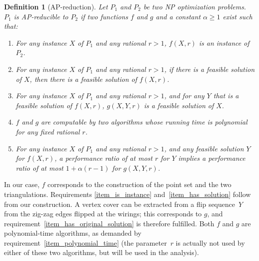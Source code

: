 \documentclass[11pt,a4paper]{article}
\newtheorem{definition}{Definition}
\begin{document}
\begin{definition}[AP-reduction]\label{def_ap_reduction}
Let $P_1$ and $P_2$ be two NP optimization problems.
$P_1$ is \emph{AP-reducible} to $P_2$ if two functions $f$ and $g$ and a constant $\alpha \geq 1$ exist such that:
\begin{enumerate}
 \item\label{item_is_instance} For any instance $X$ of $P_1$ and any rational $r > 1$, $f(X,r)$ is an instance of $P_2$.
 \item\label{item_has_solution} For any instance $X$ of $P_1$ and any rational $r > 1$, if there is a feasible solution of $X$, then there is a feasible solution of $f(X,r)$.
 \item\label{item_has_original_solution} For any instance $X$ of $P_1$ and any rational $r > 1$, and for any $Y$ that is a feasible solution of $f(X,r)$, $g(X,Y,r)$ is a feasible solution of $X$.
 \item\label{item_polynomial_time} $f$ and $g$ are computable by two algorithms whose running time is polynomial for any fixed rational $r$.
 \item\label{item_ratio_implied} For any instance $X$ of $P_1$ and any rational $r > 1$, and any feasible solution $Y$ for $f(X,r)$, a performance ratio of at most $r$ for $Y$ implies a performance ratio of at most $1 + \alpha (r-1)$ for $g(X,Y,r)$.
\end{enumerate}
\end{definition}
In our case, $f$ corresponds to the construction of the point set and the two triangulations.
Requirements \ref{item_is_instance} and~\ref{item_has_solution} follow from our construction.
A vertex cover can be extracted from a flip sequence~$Y$ from the zig-zag edges flipped at the wirings;
this corresponds to $g$, and requirement~\ref{item_has_original_solution} is therefore fulfilled.
Both $f$ and $g$ are polynomial-time algorithms, as demanded by requirement~\ref{item_polynomial_time} (the parameter~$r$ is actually not used by either of these two algorithms, but will be used in the analysis).
\end{document}
